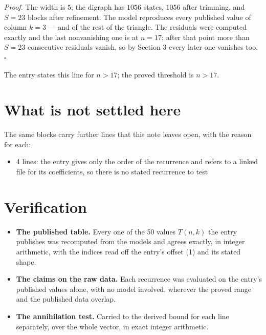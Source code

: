\documentclass[11pt]{article}
\theoremstyle{definition}
\begin{document}
{\itshape Proof.} The width is $5$; the digraph has $1056$ states, $1056$ after trimming, and $S = 23$ blocks after refinement. The model reproduces every published value of column $k = 3$ --- and of the rest of the triangle. The residuals were computed exactly and the last nonvanishing one is at $n = 17$; after that point more than $S = 23$ consecutive residuals vanish, so by Section 3 every later one vanishes too. $\square$

The entry states this line for $n > 17$; the proved threshold is $n > 17$.

\section{What is not settled here}

The same blocks carry further lines that this note leaves open, with the reason for each:

\begin{itemize}

\item 4 lines: the entry gives only the order of the recurrence and refers to a linked file for its coefficients, so there is no stated recurrence to test

\end{itemize}

\section{Verification}

\begin{itemize}

\item {\bfseries The published table.} Every one of the 50 values $T(n,k)$ the entry publishes was recomputed from the models and agrees exactly, in integer arithmetic, with the indices read off the entry's offset (1) and its stated shape.

\item {\bfseries The claims on the raw data.} Each recurrence was evaluated on the entry's published values alone, with no model involved, wherever the proved range and the published data overlap.

\item {\bfseries The annihilation test.} Carried to the derived bound for each line separately, over the whole vector, in exact integer arithmetic.

\end{itemize}
\end{document}

